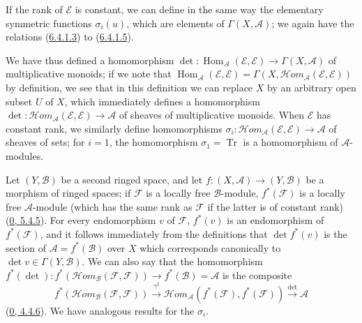 \begin{env}[6.4.8]
If the rank of $\mathcal{E}$ is constant, we can define in the same way the
elementary symmetric functions $\sigma_i(u)$, which are elements of
$\Gamma(X,\mathcal{A})$; we again have the relations
(\hyperref[II.6.4.1.3]{6.4.1.3}) to
(\hyperref[II.6.4.1.5]{6.4.1.5}).


We have thus defined a homomorphism
$\det:\operatorname{Hom}_{\mathcal{A}}(\mathcal{E},\mathcal{E})
\to\Gamma(X,\mathcal{A})$ of multiplicative monoids; if we note that
$\operatorname{Hom}_{\mathcal{A}}(\mathcal{E},\mathcal{E})=
\Gamma(X,\mathcal{H}om_{\mathcal{A}}(\mathcal{E},\mathcal{E}))$ by
definition, we see that in this definition we can replace $X$ by an
arbitrary open subset $U$ of $X$, which immediately defines a homomorphism
$\det:\mathcal{H}om_{\mathcal{A}}(\mathcal{E},\mathcal{E})\to\mathcal{A}$ of
sheaves of multiplicative monoids. When $\mathcal{E}$ has constant rank, we
similarly define homomorphisms
$\sigma_i:\mathcal{H}om_{\mathcal{A}}(\mathcal{E},\mathcal{E})
\to\mathcal{A}$ of sheaves of sets; for $i=1$, the homomorphism
$\sigma_1=\operatorname{Tr}$ is a homomorphism of $\mathcal{A}$-modules.

Let $(Y,\mathcal{B})$ be a second ringed space, and let
$f:(X,\mathcal{A})\to(Y,\mathcal{B})$ be a morphism of ringed spaces; if
$\mathcal{F}$ is a locally free $\mathcal{B}$-module,
$f^*(\mathcal{F})$ is a locally free $\mathcal{A}$-module (which has the
same rank as $\mathcal{F}$ if the latter is of constant rank)
(\hyperref[0.5.4.5]{0, 5.4.5}). For every endomorphism $v$ of
$\mathcal{F}$, $f^*(v)$ is an endomorphism of $f^*(\mathcal{F})$, and it
follows immediately from the definitions that $\det f^*(v)$ is the section of
$\mathcal{A}=f^*(\mathcal{B})$ over $X$ which corresponds canonically to
$\det v\in\Gamma(Y,\mathcal{B})$. We can also say that the homomorphism
$f^*(\det):f^*(\mathcal{H}om_{\mathcal{B}}(\mathcal{F},\mathcal{F}))
\to f^*(\mathcal{B})=\mathcal{A}$ is the composite
\[
f^*(\mathcal{H}om_{\mathcal{B}}(\mathcal{F},\mathcal{F}))
\xrightarrow{\gamma^\sharp}
\mathcal{H}om_{\mathcal{A}}(f^*(\mathcal{F}),f^*(\mathcal{F}))
\xrightarrow{\det}\mathcal{A}
\]
(\hyperref[0.4.4.6]{0, 4.4.6}). We have analogous results for the
$\sigma_i$.
\end{env}

